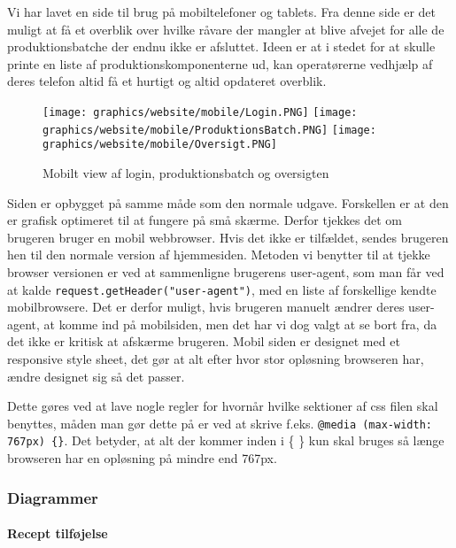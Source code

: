\documentclass[a4paper]{article}
\newenvironment{changemargin}[2]{%
\begin{list}{}{%
\setlength{\topsep}{0pt}%
\setlength{\leftmargin}{#1}%
\setlength{\rightmargin}{#2}%
\setlength{\listparindent}{\parindent}%
\setlength{\itemindent}{\parindent}%
\setlength{\parsep}{\parskip}%
}%
\item[]}{\end{list}}
\begin{document}
Vi har lavet en side til brug på mobiltelefoner og tablets. Fra denne side er det muligt at få et overblik over hvilke råvare der mangler at blive afvejet for alle de produktionsbatche der endnu ikke er afsluttet. Ideen er at i stedet for at skulle printe en liste af produktionskomponenterne ud, kan operatørerne vedhjælp af deres telefon altid få et hurtigt og altid opdateret overblik. 

\begin{figure}[H]
\begin{changemargin}{-1.2cm}{-1.2cm}
  \texttt{[image: graphics/website/mobile/Login.PNG]}
  \texttt{[image: graphics/website/mobile/ProduktionsBatch.PNG]}
  \texttt{[image: graphics/website/mobile/Oversigt.PNG]}
  \caption{Mobilt view af login, produktionsbatch og oversigten}
\end{changemargin}
\end{figure}

Siden er opbygget på samme måde som den normale udgave. Forskellen er at den er grafisk optimeret til at fungere på små skærme. Derfor tjekkes det om brugeren bruger en mobil webbrowser. Hvis det ikke er tilfældet, sendes brugeren hen til den normale version af hjemmesiden. Metoden vi benytter til at tjekke browser versionen er ved at sammenligne brugerens user-agent, som man får ved at kalde \texttt{request.getHeader("user-agent")}, med en liste af forskellige kendte mobilbrowsere. Det er derfor muligt, hvis brugeren manuelt ændrer deres user-agent, at komme ind på mobilsiden, men det har vi dog valgt at se bort fra, da det ikke er kritisk at afskærme brugeren.  Mobil siden er designet med et responsive style sheet, det gør at alt efter hvor stor opløsning browseren har, ændre designet sig så det passer.

Dette gøres ved at lave nogle regler for hvornår hvilke sektioner af css filen skal benyttes, måden man gør dette på er ved at skrive f.eks. \texttt{@media (max-width: 767px) \{\}}. Det betyder, at alt der kommer inden i \{ \} kun skal bruges så længe browseren har en opløsning på mindre end 767px.


\subsubsection*{Diagrammer} %

\paragraph{Recept tilføjelse} %
\end{document}
